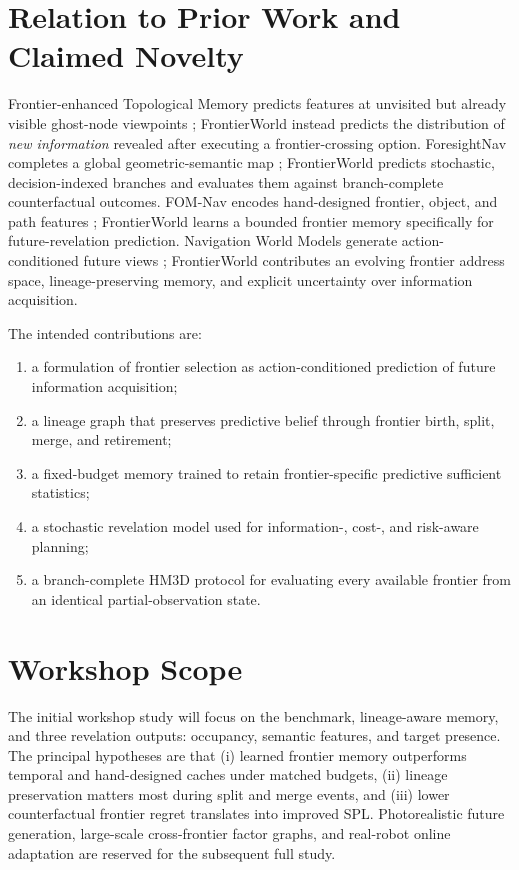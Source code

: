 \documentclass[10pt,twocolumn]{article}
\begin{document}
\section{Relation to Prior Work and Claimed Novelty}

Frontier-enhanced Topological Memory predicts features at unvisited but
already visible ghost-node viewpoints \cite{ftm}; FrontierWorld instead
predicts the distribution of \emph{new information} revealed after executing a
frontier-crossing option. ForesightNav completes a global geometric-semantic
map \cite{foresightnav}; FrontierWorld predicts stochastic, decision-indexed
branches and evaluates them against branch-complete counterfactual outcomes.
FOM-Nav encodes hand-designed frontier, object, and path features
\cite{fomnav}; FrontierWorld learns a bounded frontier memory specifically for
future-revelation prediction. Navigation World Models generate
action-conditioned future views \cite{nwm}; FrontierWorld contributes an
evolving frontier address space, lineage-preserving memory, and explicit
uncertainty over information acquisition.

The intended contributions are:

\begin{enumerate}
    \item a formulation of frontier selection as action-conditioned prediction
    of future information acquisition;
    \item a lineage graph that preserves predictive belief through frontier
    birth, split, merge, and retirement;
    \item a fixed-budget memory trained to retain frontier-specific predictive
    sufficient statistics;
    \item a stochastic revelation model used for information-, cost-, and
    risk-aware planning;
    \item a branch-complete HM3D protocol for evaluating every available
    frontier from an identical partial-observation state.
\end{enumerate}

\section{Workshop Scope}

The initial workshop study will focus on the benchmark, lineage-aware memory,
and three revelation outputs: occupancy, semantic features, and target
presence. The principal hypotheses are that (i) learned frontier memory
outperforms temporal and hand-designed caches under matched budgets,
(ii) lineage preservation matters most during split and merge events, and
(iii) lower counterfactual frontier regret translates into improved SPL.
Photorealistic future generation, large-scale cross-frontier factor graphs,
and real-robot online adaptation are reserved for the subsequent full study.
\end{document}
